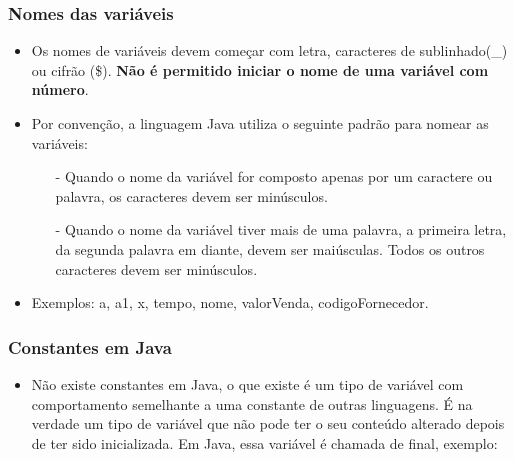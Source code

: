 \documentclass{beamer}
\begin{document}
\begin{frame}
	\frametitle{Nomes das variáveis}
	\begin{itemize}
		\item Os nomes de variáveis devem começar com letra, caracteres de sublinhado(\_) ou cifrão (\$). \textbf{Não é permitido iniciar o nome de uma variável com número}.
		\item Por convenção, a linguagem Java utiliza o seguinte padrão para nomear as variáveis:
		\begin{itemize}
			\item[-] Quando o nome da variável for composto apenas por um caractere ou palavra, os caracteres devem ser minúsculos.
			\item[-] Quando o nome da variável tiver mais de uma palavra, a primeira letra, da segunda palavra em diante, devem ser maiúsculas. Todos os outros caracteres devem ser minúsculos.
		\end{itemize}
		\item Exemplos: a, a1, x, tempo, nome, valorVenda, codigoFornecedor.
	\end{itemize}
\end{frame}	
\begin{frame}
	\frametitle{Constantes em Java}
	\begin{itemize}
		\item Não existe constantes em Java, o que existe é um tipo de variável com comportamento semelhante a uma constante de outras linguagens. É na verdade um tipo de variável que não pode ter o seu conteúdo alterado depois de ter sido inicializada. Em Java, essa variável é chamada de final, exemplo:
	\end{itemize}
	\inputminted{java}{codigos/TiposDados02.java}
\end{frame}
\end{document}
